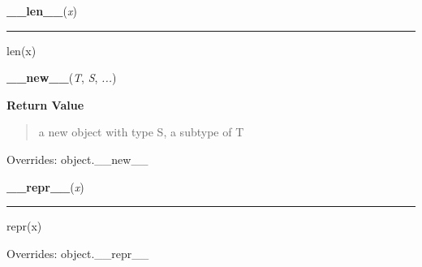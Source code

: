     \label{pygame:PixelArray:__len__}

    \vspace{0.5ex}

\hspace{.8\funcindent}\begin{boxedminipage}{\funcwidth}

    \raggedright \textbf{\_\_len\_\_}(\textit{x})

    \vspace{-1.5ex}

    \rule{\textwidth}{0.5\fboxrule}
\setlength{\parskip}{2ex}
    len(x)

\setlength{\parskip}{1ex}
    \end{boxedminipage}

    \vspace{0.5ex}

\hspace{.8\funcindent}\begin{boxedminipage}{\funcwidth}

    \raggedright \textbf{\_\_new\_\_}(\textit{T}, \textit{S}, \textit{...})

\setlength{\parskip}{2ex}
\setlength{\parskip}{1ex}
      \textbf{Return Value}
    \vspace{-1ex}

      \begin{quote}
      a new object with type S, a subtype of T

      \end{quote}

      Overrides: object.\_\_new\_\_

    \end{boxedminipage}

    \vspace{0.5ex}

\hspace{.8\funcindent}\begin{boxedminipage}{\funcwidth}

    \raggedright \textbf{\_\_repr\_\_}(\textit{x})

    \vspace{-1.5ex}

    \rule{\textwidth}{0.5\fboxrule}
\setlength{\parskip}{2ex}
    repr(x)

\setlength{\parskip}{1ex}
      Overrides: object.\_\_repr\_\_

    \end{boxedminipage}

